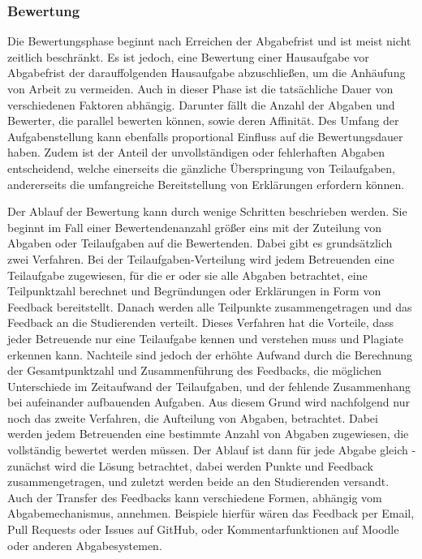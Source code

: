 \subsubsection{Bewertung}

Die Bewertungsphase beginnt nach Erreichen der Abgabefrist und ist meist nicht zeitlich beschränkt.
Es ist jedoch, eine Bewertung einer Hausaufgabe vor Abgabefrist der darauffolgenden Hausaufgabe abzuschließen, um die Anhäufung von Arbeit zu vermeiden.
Auch in dieser Phase ist die tatsächliche Dauer von verschiedenen Faktoren abhängig.
Darunter fällt die Anzahl der Abgaben und Bewerter, die parallel bewerten können, sowie deren Affinität.
Des Umfang der Aufgabenstellung kann ebenfalls proportional Einfluss auf die Bewertungsdauer haben.
Zudem ist der Anteil der unvollständigen oder fehlerhaften Abgaben entscheidend, welche einerseits die gänzliche Überspringung von Teilaufgaben, andererseits die umfangreiche Bereitstellung von Erklärungen erfordern können.

Der Ablauf der Bewertung kann durch wenige Schritten beschrieben werden.
Sie beginnt im Fall einer Bewertendenanzahl größer eins mit der Zuteilung von Abgaben oder Teilaufgaben auf die Bewertenden.
Dabei gibt es grundsätzlich zwei Verfahren.
Bei der Teilaufgaben-Verteilung wird jedem Betreuenden eine Teilaufgabe zugewiesen, für die er oder sie alle Abgaben betrachtet, eine Teilpunktzahl berechnet und Begründungen oder Erklärungen in Form von Feedback bereitstellt.
Danach werden alle Teilpunkte zusammengetragen und das Feedback an die Studierenden verteilt.
Dieses Verfahren hat die Vorteile, dass jeder Betreuende nur eine Teilaufgabe kennen und verstehen muss und Plagiate erkennen kann.
Nachteile sind jedoch der erhöhte Aufwand durch die Berechnung der Gesamtpunktzahl und Zusammenführung des Feedbacks, die möglichen Unterschiede im Zeitaufwand der Teilaufgaben, und der fehlende Zusammenhang bei aufeinander aufbauenden Aufgaben.
Aus diesem Grund wird nachfolgend nur noch das zweite Verfahren, die Aufteilung von Abgaben, betrachtet.
Dabei werden jedem Betreuenden eine bestimmte Anzahl von Abgaben zugewiesen, die vollständig bewertet werden müssen.
Der Ablauf ist dann für jede Abgabe gleich - zunächst wird die Lösung betrachtet, dabei werden Punkte und Feedback zusammengetragen, und zuletzt werden beide an den Studierenden versandt.
Auch der Transfer des Feedbacks kann verschiedene Formen, abhängig vom Abgabemechanismus, annehmen.
Beispiele hierfür wären das Feedback per Email, Pull Requests oder Issues auf GitHub, oder Kommentarfunktionen auf Moodle oder anderen Abgabesystemen.

